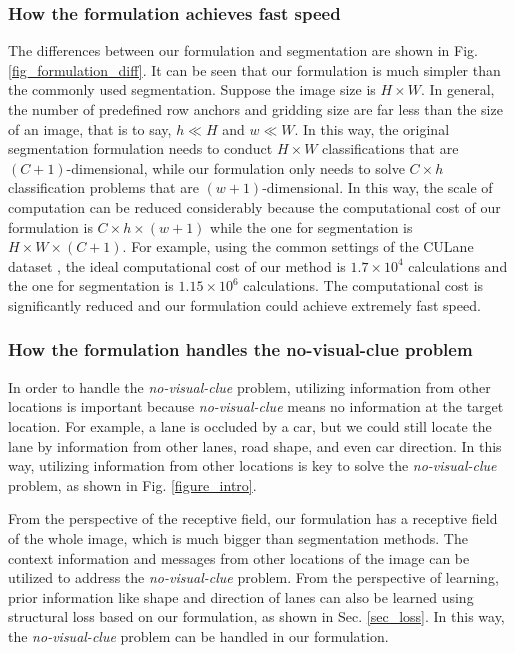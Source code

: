 \documentclass[runningheads]{llncs}
\begin{document}
\subsubsection{How the formulation achieves fast speed}
The differences between our formulation and segmentation are shown in Fig. \ref{fig_formulation_diff}. It can be seen that our formulation is much simpler than the commonly used segmentation. Suppose the image size is $H \times W$. In general, the number of predefined row anchors and gridding size are far less than the size of an image, that is to say, $h \ll H$ and $w \ll W$. In this way, the original segmentation formulation needs to conduct $H \times W$ classifications that are $(C+1)$-dimensional, while our formulation only needs to solve $C \times h$ classification problems that are $(w+1)$-dimensional. In this way, the scale of computation can be reduced considerably because the computational cost of our formulation is $C\times h\times (w+1)$ while the one for segmentation is $H\times W \times (C+1)$. For example, using the common settings of the CULane dataset \cite{SCNN}, the ideal computational cost of our method is $1.7\times10^4$ calculations and the one for segmentation is $1.15\times 10^6$ calculations. The computational cost is significantly reduced and our formulation could achieve extremely fast speed.

\subsubsection{How the formulation handles the no-visual-clue problem}
In order to handle the \textit{no-visual-clue} problem, utilizing information from other locations is important because \textit{no-visual-clue} means no information at the target location. For example, a lane is occluded by a car, but we could still locate the lane by information from other lanes, road shape, and even car direction. In this way, utilizing information from other locations is key to solve the \textit{no-visual-clue} problem, as shown in Fig. \ref{figure_intro}.

From the perspective of the receptive field, our formulation has a receptive field of the whole image, which is much bigger than segmentation methods. The context information and messages from other locations of the image can be utilized to address the \textit{no-visual-clue} problem. 
From the perspective of learning, prior information like shape and direction of lanes can also be learned using structural loss based on our formulation, as shown in Sec. \ref{sec_loss}. In this way, the \textit{no-visual-clue} problem can be handled in our formulation.
 
\end{document}

